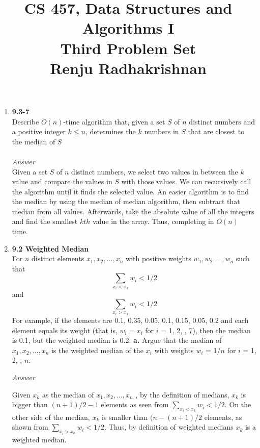 \documentclass{article}
\begin{document}
\title{CS 457, Data Structures and Algorithms I\\
Third Problem Set\\
Renju Radhakrishnan}
\maketitle
\begin{center}
\end{center}

\begin{enumerate}
\item \textbf{9.3-7}\\
Describe $O(n)$-time algorithm that, given a set $S$ of $n$ distinct numbers and a positive integer $k\leq n$, determines the $k$ numbers in $S$ that are closest to the median of $S$ \\ \\
{\textit{Answer}} \\
Given a set $S$ of $n$ distinct numbers, we select two values in between the $k$ value and compare the values in $S$ with those values. We can recursively call the algorithm until it finds the selected value. An easier algorithm is to find the median by using the median of median algorithm, then subtract that median from all values. Afterwards, take the absolute value of all the integers and find the smallest $kth$ value in the array. Thus, completing in $O(n)$ time.
\newpage
\item \textbf{9.2 Weighted Median}\\
For $n$ distinct elements $x_1, x_2, \dotso, x_n$ with positive weights $w_1, w_2, \dotso, w_n$ such that $$\sum_{x_i < x_k} w_i < 1/2$$ and $$\sum_{x_i > x_k} w_i < 1/2$$
For example, if the elements are 0.1, 0.35, 0.05, 0.1, 0.15, 0.05, 0.2 and each element equals its weight (that is, $w_i = x_i$ for $i$ = 1, 2, \dotso, 7), then the median is 0.1, but the weighted median is 0.2.
\subitem \textbf{a.} Argue that the median of $x_1, x_2, \dotso, x_n$ is the weighted median of the $x_i$ with weights $w_i$ = 1/$n$ for $i$ = 1, 2, \dotso, $n$. 

{\textit{Answer}}

Given $x_k$ as the median of $x_1, x_2, \dotso, x_n$ , by the definition of medians, $x_k$ is bigger than $(n + 1)/2 - 1$ elements as seen from $\sum_{x_i < x_k} w_i < 1/2$. On the other side of the median, $x_k$ is smaller than $(n - (n+1)/2$ elements, as shown from $\sum_{x_i > x_k} w_i < 1/2$. Thus, by definition of weighted medians $x_k$ is a weighted median.


\end{enumerate}
\end{document}
